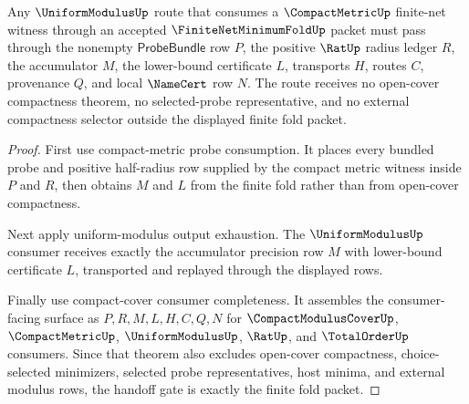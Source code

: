\begin{theorem}
\label{thm:finitenetminimumfold-uniformmodulus-compactmetric-handoff-gate}
Any $\UniformModulusUp$ route that consumes a $\CompactMetricUp$ finite-net witness through an accepted $\FiniteNetMinimumFoldUp$ packet must pass through the nonempty $\mathsf{ProbeBundle}$ row $P$, the positive $\RatUp$ radius ledger $R$, the accumulator $M$, the lower-bound certificate $L$, transports $H$, routes $C$, provenance $Q$, and local $\NameCert$ row $N$. The route receives no open-cover compactness theorem, no selected-probe representative, and no external compactness selector outside the displayed finite fold packet.
\end{theorem}
\begin{proof}
First use compact-metric probe consumption. It places every bundled probe and positive half-radius row supplied by the compact metric witness inside $P$ and $R$, then obtains $M$ and $L$ from the finite fold rather than from open-cover compactness.

Next apply uniform-modulus output exhaustion. The $\UniformModulusUp$ consumer receives exactly the accumulator precision row $M$ with lower-bound certificate $L$, transported and replayed through the displayed rows.

Finally use compact-cover consumer completeness. It assembles the consumer-facing surface as $P,R,M,L,H,C,Q,N$ for $\CompactModulusCoverUp$, $\CompactMetricUp$, $\UniformModulusUp$, $\RatUp$, and $\TotalOrderUp$ consumers. Since that theorem also excludes open-cover compactness, choice-selected minimizers, selected probe representatives, host minima, and external modulus rows, the handoff gate is exactly the finite fold packet.
\end{proof}

